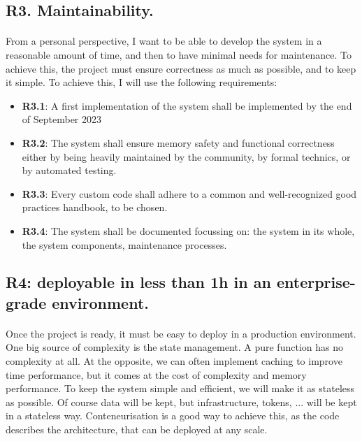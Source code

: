 \subsection{R3. Maintainability. }

\paragraph{}
From a personal perspective, I want to be able to develop the system in a reasonable amount of time, and then to have minimal needs for maintenance. To achieve this, the project must ensure correctness as much as possible, and to keep it simple. To achieve this, I will use the following requirements:

\begin{itemize}  
    \item \textbf{R3.1}: A first implementation of the system shall be implemented by the end of September 2023
    \item \textbf{R3.2}: The system shall ensure memory safety and functional correctness either by being heavily maintained by the community, by formal technics, or by automated testing. 
    \item \textbf{R3.3}: Every custom code shall adhere to a common and well-recognized good practices handbook, to be chosen. 
    \item \textbf{R3.4}: The system shall be documented focussing on: the system in its whole, the system components, maintenance processes. 
\end{itemize}

\subsection{R4: deployable in less than 1h in an enterprise-grade environment.}

\paragraph{}
Once the project is ready, it must be easy to deploy in a production environment. One big source of complexity is the state management. A pure function has no complexity at all. At the opposite, we can often implement caching to improve time performance, but it comes at the cost of complexity and memory performance. To keep the system simple and efficient, we will make it as stateless as possible. Of course data will be kept, but infrastructure, tokens, ... will be kept in a stateless way. Conteneurisation is a good way to achieve this, as the code describes the architecture, that can be deployed at any scale. 

